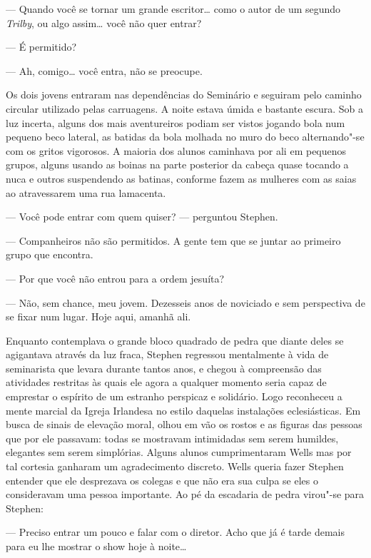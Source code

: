 --- Quando você se tornar um grande escritor\ldots{} como o autor de
um segundo \textit{Trilby}, ou algo assim\ldots{} você não quer entrar?

--- É permitido?

--- Ah, comigo\ldots{} você entra, não se preocupe.

Os dois jovens entraram nas dependências do Seminário e seguiram
pelo caminho circular utilizado pelas carruagens.  A noite estava úmida
e bastante escura.  Sob a luz incerta, alguns dos mais aventureiros
podiam ser vistos jogando bola num pequeno beco lateral, as batidas da
bola molhada no muro do beco alternando"-se com os gritos vigorosos.  A
maioria dos alunos caminhava por ali em pequenos grupos, alguns usando
as boinas na parte posterior da cabeça quase tocando a nuca e outros
suspendendo as batinas, conforme fazem as mulheres com as saias ao
atravessarem uma rua lamacenta.

--- Você pode entrar com quem quiser? --- perguntou Stephen.

--- \label{companheiros"-nao} Companheiros não são permitidos.  A gente tem que se juntar
ao primeiro grupo que encontra.

--- Por que você não entrou para a ordem jesuíta?

--- Não, sem chance, meu jovem.  Dezesseis anos de noviciado e
sem perspectiva de se fixar num lugar.  Hoje aqui, amanhã ali.

Enquanto contemplava o grande bloco quadrado de pedra que diante
deles se agigantava através da luz fraca, Stephen regressou mentalmente
à vida de seminarista que levara durante tantos anos, e chegou à
compreensão das atividades restritas às quais ele agora a qualquer
momento seria capaz de emprestar o espírito de um estranho perspicaz e
solidário.  Logo reconheceu a mente marcial da Igreja Irlandesa no
estilo daquelas instalações eclesiásticas.  Em busca de sinais de
elevação moral, olhou em vão os rostos e as figuras das pessoas que por
ele passavam: todas se mostravam intimidadas sem serem humildes,
elegantes sem serem simplórias.  Alguns alunos cumprimentaram Wells mas
por tal cortesia ganharam um agradecimento discreto.  Wells queria
fazer Stephen entender que ele desprezava os colegas e que não era sua
culpa se eles o consideravam uma pessoa importante.  Ao pé da escadaria
de pedra virou"-se para Stephen:

--- Preciso entrar um pouco e falar com o diretor.  Acho que já é
tarde demais para eu lhe mostrar o show hoje à noite\ldots{}		

